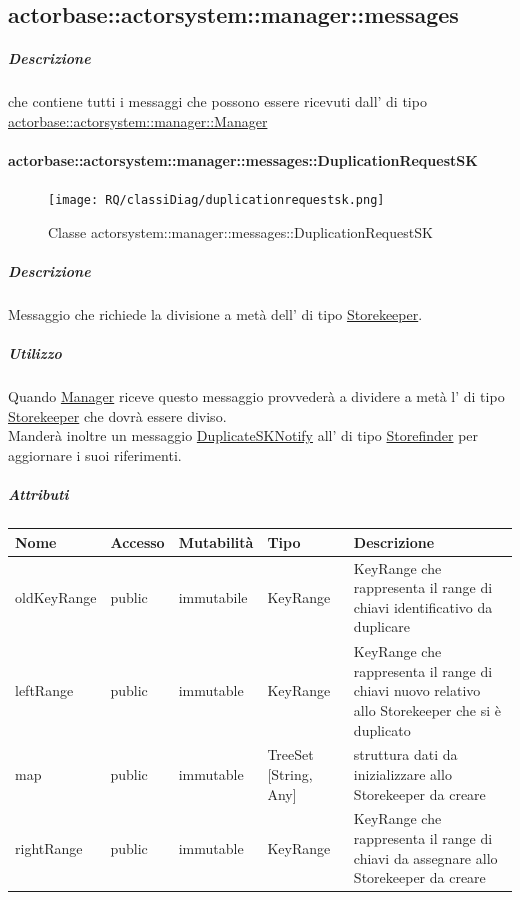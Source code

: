\documentclass{scalatekids-article}
\begin{document}
\subsection{actorbase::actorsystem::manager::messages}
\label{sec:actorbase::actorsystem::manager::messages}

\subparagraph{Descrizione}
 che contiene tutti i messaggi che possono essere ricevuti
dall' di tipo
\hyperref[sec:actorbase::actorsystem::manager::Manager]{actorbase::\allowbreak{}actorsystem::\allowbreak{}manager::\allowbreak{}Manager}

\paragraph{actorbase::actorsystem::manager::messages::DuplicationRequestSK}
\label{sec:actorbase::actorsystem::manager::messages::DuplicationRequestSK}

\begin{figure}[H]
   \begin{center}
     \texttt{[image: RQ/classiDiag/duplicationrequestsk.png]}
     \caption{Classe actorsystem::manager::messages::DuplicationRequestSK}
   \end{center}
 \end{figure}

\subparagraph{Descrizione}

Messaggio che richiede la divisione a metà dell' di tipo
\hyperref[sec:actorbase::actorsystem::storekeeper::Storekeeper]{Storekeeper}.

\subparagraph{Utilizzo}

Quando \hyperref[sec:actorbase::actorsystem::manager::Manager]{Manager}
riceve questo messaggio provvederà a dividere a metà l' di tipo
\hyperref[sec:actorbase::actorsystem::storekeeper::Storekeeper]{Storekeeper}
che dovrà essere diviso.\\Manderà inoltre un messaggio \hyperref[sec:actorbase::actorsystem::storefinder::messages::DuplicateSKNotify]{DuplicateSKNotify} all' di tipo
\hyperref[sec:actorbase::actorsystem::storefinder::Storefinder]{Storefinder}
per aggiornare i suoi riferimenti.

\subparagraph{Attributi}
\begin{tabular}{| p{3cm} | p{1.5cm} | p{2cm} | p{2cm} | p{8.5cm} |}
  \hline
  Nome & Accesso & Mutabilità & Tipo & Descrizione\\
  \hline
  oldKeyRange & public & immutabile & KeyRange & KeyRange che rappresenta il range di chiavi identificativo da duplicare\\
  \hline
  leftRange & public & immutable & KeyRange & KeyRange che rappresenta il range di chiavi nuovo relativo allo Storekeeper che si è duplicato\\
  \hline
  map & public & immutable & TreeSet [String, Any] & struttura dati da inizializzare allo Storekeeper da creare\\
  \hline
  rightRange & public & immutable & KeyRange & KeyRange che rappresenta il range di chiavi da assegnare allo Storekeeper da creare\\
  \hline
\end{tabular}
\end{document}
